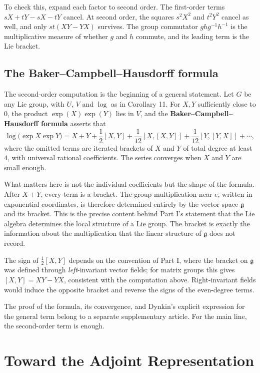 \documentclass[11pt]{article}
\begin{document}
To check this, expand each factor to second order. The first-order terms $sX + tY - sX - tY$ cancel. At second order, the squares $s^2X^2$ and $t^2Y^2$ cancel as well, and only $st(XY - YX)$ survives. The group commutator $ghg^{-1}h^{-1}$ is the multiplicative measure of whether $g$ and $h$ commute, and its leading term is the Lie bracket.

\subsection{The Baker–Campbell–Hausdorff formula}

The second-order computation is the beginning of a general statement. Let $G$ be any Lie group, with $U$, $V$ and $\log$ as in Corollary 11. For $X, Y$ sufficiently close to $0$, the product $\exp(X)\exp(Y)$ lies in $V$, and the \textbf{Baker–Campbell–Hausdorff formula} asserts that
\[
\boxed{
\log\bigl(\exp X \exp Y\bigr) = X + Y + \frac12 [X, Y] + \frac1{12}[X, [X, Y]] + \frac1{12}[Y, [Y, X]] + \cdots,
}
\]
where the omitted terms are iterated brackets of $X$ and $Y$ of total degree at least $4$, with universal rational coefficients. The series converges when $X$ and $Y$ are small enough.

What matters here is not the individual coefficients but the shape of the formula. After $X + Y$, every term is a bracket. The group multiplication near $e$, written in exponential coordinates, is therefore determined entirely by the vector space $\mathfrak{g}$ and its bracket. This is the precise content behind Part I's statement that the Lie algebra determines the local structure of a Lie group. The bracket is exactly the information about the multiplication that the linear structure of $\mathfrak{g}$ does not record.

The sign of $\frac12[X, Y]$ depends on the convention of Part I, where the bracket on $\mathfrak{g}$ was defined through \emph{left}-invariant vector fields; for matrix groups this gives $[X, Y] = XY - YX$, consistent with the computation above. Right-invariant fields would induce the opposite bracket and reverse the signs of the even-degree terms.

The proof of the formula, its convergence, and Dynkin's explicit expression for the general term belong to a separate supplementary article. For the main line, the second-order term is enough.

\section{Toward the Adjoint Representation}
\end{document}
